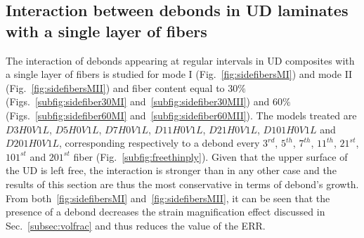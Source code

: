 \documentclass[review]{elsarticle}
\begin{document}
\subsection{Interaction between debonds in UD laminates with a single layer of fibers}

The interaction of debonds appearing at regular intervals in UD composites with a single layer of fibers is studied for mode I (Fig.~\ref{fig:sidefibersMI}) and mode II (Fig.~\ref{fig:sidefibersMII}) and fiber content equal to $30\%$ (Figs.~\ref{subfig:sidefiber30MI} and~\ref{subfig:sidefiber30MII}) and $60\%$ (Figs.~\ref{subfig:sidefiber60MI} and~\ref{subfig:sidefiber60MII}). The models treated are $D3H0V1L$, $D5H0V1L$, $D7H0V1L$, $D11H0V1L$, $D21H0V1L$, $D101H0V1L$ and $D201H0V1L$, corresponding respectively to a debond every $3^{rd}$, $5^{th}$, $7^{th}$, $11^{th}$, $21^{st}$, $101^{st}$ and $201^{st}$ fiber (Fig.~\ref{subfig:freethinply}). Given that the upper surface of the UD is left free, the interaction is stronger than in any other case and the results of this section are thus the most conservative in terms of debond's growth. From both~\ref{fig:sidefibersMI} and~\ref{fig:sidefibersMII}, it can be seen that the presence of a debond decreases the strain magnification effect discussed in Sec.~\ref{subsec:volfrac} and thus reduces the value of the ERR. 
\end{document}
